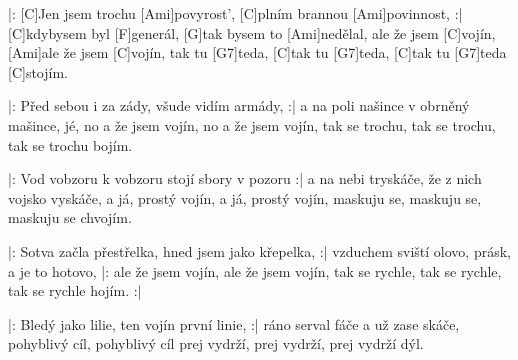 
\sloka
|: [C]Jen jsem trochu [Ami]povyrost’, [C]plním brannou [Ami]povinnost, :|
[C]kdybysem byl [F]generál, [G]tak bysem to [Ami]nedělal,
ale že jsem [C]vojín, [Ami]ale že jsem [C]vojín,
tak tu [G7]teda, [C]tak tu [G7]teda, [C]tak tu [G7]teda [C]stojím.

\sloka
|: Před sebou i za zády, všude vidím armády, :|
a na poli našince v obrněný mašince, jé,
no a že jsem vojín, no a že jsem vojín,
tak se trochu, tak se trochu, tak se trochu bojím.

\sloka
|: Vod vobzoru k vobzoru stojí sbory v pozoru :|
a na nebi tryskáče, že z nich vojsko vyskáče,
a já, prostý vojín, a já, prostý vojín,
maskuju se, maskuju se, maskuju se chvojím.

\sloka
|: Sotva začla přestřelka, hned jsem jako křepelka, :|
vzduchem sviští olovo, prásk, a je to hotovo,
|: ale že jsem vojín, ale že jsem vojín,
tak se rychle, tak se rychle, tak se rychle hojím. :|

\sloka
|: Bledý jako lilie, ten vojín první linie, :|
ráno serval fáče a už zase skáče,
pohyblivý cíl, pohyblivý cíl
prej vydrží, prej vydrží, prej vydrží dýl.
